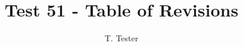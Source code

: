 \documentclass[12pt]{article}
\title{Test 51 - Table of Revisions}
\author{T. Tester}
\begin{document}
\maketitle
\tableofrevisions
\end{document}
